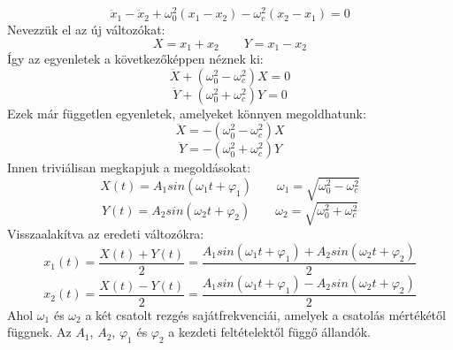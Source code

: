 \documentclass[../main.tex]{subfiles}
\begin{document}
\begin{equation}
    \ddot{x}_1 - \ddot{x}_2 + \omega_0^2 (x_1 - x_2) - \omega_c^2 (x_2 - x_1) = 0
\end{equation}
Nevezzük el az új változókat:
\begin{equation}
    X = x_1 + x_2 \quad \quad Y = x_1 - x_2
\end{equation}
Így az egyenletek a következőképpen néznek ki:
\begin{equation}
    \ddot{X} + (\omega_0^2 - \omega_c^2) X = 0
\end{equation}
\begin{equation}
    \ddot{Y} + (\omega_0^2 + \omega_c^2) Y = 0
\end{equation}
Ezek már független egyenletek, amelyeket könnyen megoldhatunk:
\begin{equation}
    \ddot{X} = - (\omega_0^2 - \omega_c^2) X
\end{equation}
\begin{equation}
    \ddot{Y} = - (\omega_0^2 + \omega_c^2) Y
\end{equation}
Innen triviálisan megkapjuk a megoldásokat:
\begin{equation}
    X(t) = A_1 sin(\omega_1 t + \varphi_1) \quad \quad \omega_1 = \sqrt{\omega_0^2 - \omega_c^2}
\end{equation}
\begin{equation}
    Y(t) = A_2 sin(\omega_2 t + \varphi_2) \quad \quad \omega_2 = \sqrt{\omega_0^2 + \omega_c^2}
\end{equation}
Visszaalakítva az eredeti változókra:
\begin{equation}
    x_1(t) = \frac{X(t) + Y(t)}{2} = \frac{A_1 sin(\omega_1 t + \varphi_1) + A_2 sin(\omega_2 t + \varphi_2)}{2}
\end{equation}
\begin{equation}
    x_2(t) = \frac{X(t) - Y(t)}{2} = \frac{A_1 sin(\omega_1 t + \varphi_1) - A_2 sin(\omega_2 t + \varphi_2)}{2}
\end{equation}
Ahol $\omega_1$ és $\omega_2$ a két csatolt rezgés sajátfrekvenciái, amelyek a csatolás mértékétől függnek. Az $A_1$, $A_2$, $\varphi_1$ és $\varphi_2$ a kezdeti feltételektől függő állandók.
\end{document}
